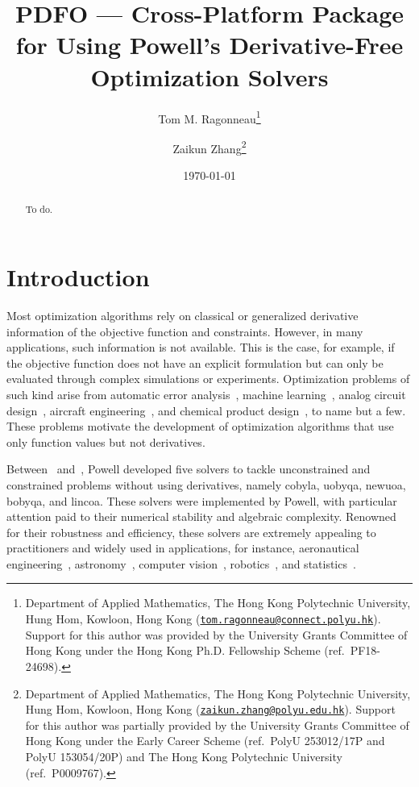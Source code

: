 \documentclass[11pt,draft]{article}
\title{PDFO --- Cross-Platform Package for Using Powell's Derivative-Free Optimization Solvers}
\author{
    Tom M. Ragonneau\thanks{
        Department of Applied Mathematics,
        The Hong Kong Polytechnic University,
        Hung Hom, Kowloon, Hong Kong
        (\href{mailto:tom.ragonneau@connect.polyu.hk}{\texttt{tom.ragonneau@connect.polyu.hk}}).
        Support for this author was provided by the University Grants Committee of Hong Kong under the Hong Kong Ph.D. Fellowship Scheme (ref.\ PF18-24698).
    }
    \and Zaikun Zhang\thanks{
        Department of Applied Mathematics,
        The Hong Kong Polytechnic University,
        Hung Hom, Kowloon, Hong Kong
        (\href{mailto:zaikun.zhang@polyu.edu.hk}{\texttt{zaikun.zhang@polyu.edu.hk}}).
        Support for this author was partially provided by the University Grants Committee of Hong Kong under the  Early Career Scheme (ref.\ PolyU 253012/17P and PolyU 153054/20P) and The Hong Kong Polytechnic University (ref.\ P0009767).
    }
}
\date{\today}
\begin{document}
\maketitle

\begin{abstract}
    To do.
\end{abstract}

\section{Introduction}

Most optimization algorithms rely on classical or generalized derivative information of the objective function and constraints.
However, in many applications, such information is not available.
This is the case, for example, if the objective function does not have an explicit formulation but can only be evaluated through complex simulations or experiments.
Optimization problems of such kind arise from automatic error analysis~\cite{Higham_1993,Higham_2002}, machine learning~\cite{Ghanbari_Scheinberg_2017}, analog circuit design~\cite{Latorre_Etal_2019}, aircraft engineering~\cite{Gazaix_Etal_2019}, and chemical product design~\cite{Sun_Etal_2020}, to name but a few.
These problems motivate the development of optimization algorithms that use only function values but not derivatives.

Between~\citeyear{Powell_1994} and~\citeyear{Powell_2015}, Powell developed five solvers to tackle unconstrained and constrained problems without using derivatives, namely \gls{cobyla}, \gls{uobyqa}, \gls{newuoa}, \gls{bobyqa}, and \gls{lincoa}.
These solvers were implemented by Powell, with particular attention paid to their numerical stability and algebraic complexity.
Renowned for their robustness and efficiency, these solvers are extremely appealing to practitioners and widely used in applications, for instance, aeronautical engineering~\cite{Gallard_Etal_2018b}, astronomy~\cite{Biviano_Etal_2013,Mamon_Biviano_Boue_2013}, computer vision~\cite{Izadinia_Shan_Seitz_2017}, robotics~\cite{Mombaur_Truong_Laumond_2010}, and statistics~\cite{Bates_Etal_2015}.
\end{document}

